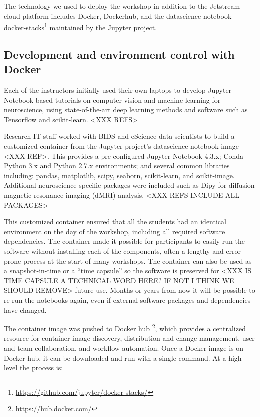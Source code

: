 The technology we used to deploy the workshop in addition to the Jetstream cloud
platform includes Docker, Dockerhub, and the datascience-notebook docker-stacks\footnote{\url{https://github.com/jupyter/docker-stacks/}}
maintained by the Jupyter project.

\subsection{Development and environment control with Docker}

Each of the instructors initially used their own laptops to develop Jupyter
Notebook-based tutorials on computer vision and machine learning for
neuroscience, using state-of-the-art deep learning methods and software such as
Tensorflow and scikit-learn. <XXX REFS>

Research IT staff worked with BIDS and eScience data scientists to build a
customized container from the Jupyter project's datascience-notebook image <XXX REF>. This
provides a pre-configured Jupyter Notebook 4.3.x; Conda Python 3.x and Python
2.7.x environments; and several common libraries including: pandas, matplotlib,
scipy, seaborn, scikit-learn, and scikit-image. Additional neuroscience-specific
packages were included such as Dipy for diffusion magnetic resonance imaging
(dMRI) analysis. <XXX REFS INCLUDE ALL PACKAGES>

This customized container ensured that all the students had an identical
environment on the day of the workshop, including all required software
dependencies. The container made it possible for participants to easily run
the software without installing each of the components, often a lengthy and
error-prone process at the start of many workshops. The container can also be
used as a snapshot-in-time or a ``time capsule'' so the software is preserved for
<XXX IS TIME CAPSULE A TECHNICAL WORD HERE? IF NOT I THINK WE SHOULD REMOVE>
future use. Months or years from now it will be possible to re-run the notebooks
again, even if external software packages and dependencies have changed.

The container image was pushed to Docker hub \footnote{\url{https://hub.docker.com/}},
which provides a centralized resource for container image discovery,
distribution and change management, user and team collaboration, and workflow
automation. Once a Docker image is on Docker hub, it can be downloaded and run
with a single command. At a high-level the process is:

